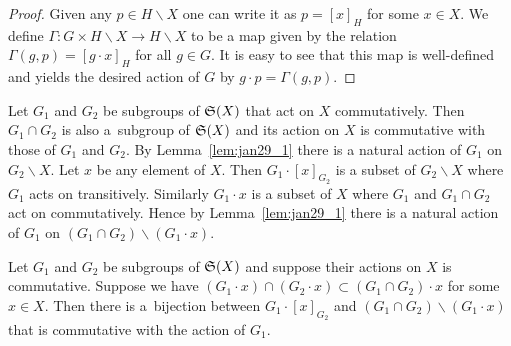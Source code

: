 \begin{proof}
Given any $p \in H \backslash X$ one can write it as $p = [x]_H$ for some $x \in X$.
We def\/ine $\varGamma : G \times H \backslash X \rightarrow H \backslash X$ to be a map given
by the relation $\varGamma (g,  p) = [g \cdot x]_H$ for all $g \in G$.
It is easy to see that this map is well-def\/ined and yields the desired action of $G$ by $g \cdot p = \varGamma (g,  p)$.
\end{proof}
Let $G_1$ and $G_2$ be subgroups of ${\frak S}(X)$ that act on $X$ commutatively.
Then $G_1 \cap G_2$ is also a~subgroup of ${\frak S}(X)$
and its action on $X$ is commutative with those of $G_1$ and $G_2$.
By Lemma~\ref{lem:jan29_1} there is a natural action of $G_1$ on $G_2 \backslash X$.
Let $x$ be any element of $X$.
{Then $G_1 \cdot [x]_{G_2}$ is a subset of $G_2 \backslash X$ where
$G_1$ acts on transitively.
Similarly $G_1 \cdot x$ is a subset of $X$ where $G_1$ and $G_1 \cap G_2$ act on commutatively.}
Hence by Lemma~\ref{lem:jan29_1}  there is a natural action of $G_1$ on
$(G_1 \cap G_2) \backslash (G_1 \cdot x)$.
\begin{proposition}\label{prop:jan29_3}
Let $G_1$ and $G_2$ be subgroups of ${\frak S}(X)$ and suppose their actions on $X$ is commutative.
Suppose we have $(G_1 \cdot x) \cap (G_2 \cdot x) \subset (G_1 \cap G_2) \cdot x$ for some $x \in X$.
Then there is a~bijection between $G_1 \cdot [x]_{G_2}$ and $(G_1 \cap G_2) \backslash (G_1 \cdot x)$
that is commutative with the action of $G_1$.
\end{proposition}
